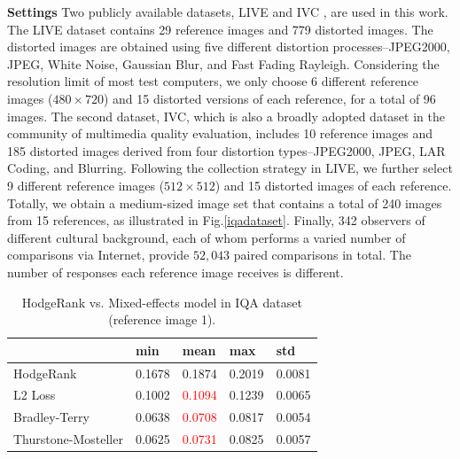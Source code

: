 \documentclass[10pt,journal,cspaper,compsoc]{IEEEtran}
\begin{document}
{\textbf{Settings} Two publicly available datasets, LIVE
\cite{LIVE} and IVC \cite{IVC}, are used in this work. The LIVE dataset contains 29 reference images and 779 distorted images. The distorted images are obtained using five different distortion processes--JPEG2000, JPEG, White Noise, Gaussian Blur, and Fast Fading Rayleigh. Considering the resolution limit of most test computers, we only choose 6 different reference images ($480 \times 720$) and 15 distorted versions of each reference, for a total of 96 images. The second dataset, IVC, which is also a broadly adopted dataset in the community of multimedia quality evaluation, includes 10 reference images and 185 distorted images derived from four distortion types--JPEG2000, JPEG, LAR Coding, and Blurring. Following the collection strategy in LIVE, we further select 9 different reference images ($512 \times 512$) and 15 distorted images of each reference. Totally, we obtain a medium-sized image set that contains a total of 240 images from 15 references, as illustrated in Fig.\ref{iqadataset}.
Finally, 342 observers of different
cultural background, each of whom performs a varied number of comparisons via Internet, provide
$52,043$  paired comparisons in total. The number of responses each reference image receives is different.



\begin{table}[t]\caption{\label{tab:iqa} HodgeRank vs. Mixed-effects model in IQA dataset (reference image 1).}
\centering
\begin{tabular}{lllll}
 \hline     &min  &mean &max &std\\
 \hline  HodgeRank     &0.1678    &0.1874    &0.2019    &0.0081 \\
\hline  L2 Loss     &0.1002    &\textcolor{red}{0.1094}    &0.1239    &0.0065  \\
\hline Bradley-Terry     &0.0638    &\textcolor{red}{0.0708}    &0.0817    &0.0054 \\
\hline Thurstone-Mosteller     &0.0625     &\textcolor{red}{0.0731}    &0.0825    &0.0057  \\
 \hline
 \end {tabular}
\end{table}




}
\end{document}

